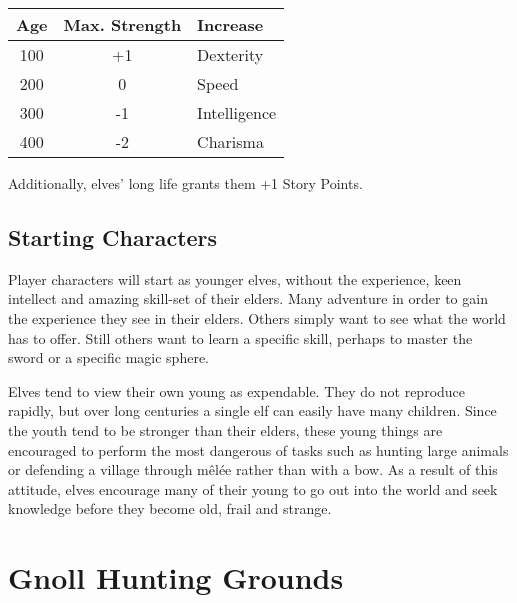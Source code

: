 \begin{multicols}{2}
	\begin{tabular}{ccl}

		Age & Max. Strength & Increase \\\hline

		100 & +1 & Dexterity \\

		200 & 0 & Speed \\

		300 & -1 & Intelligence \\

		400 & -2 & Charisma \\

	\end{tabular}

Additionally, elves' long life grants them +1 Story Points.

\subsection{Starting Characters}

Player characters will start as younger elves, without the experience, keen intellect and amazing skill-set of their elders. Many adventure in order to gain the experience they see in their elders. Others simply want to see what the world has to offer. Still others want to learn a specific skill, perhaps to master the sword or a specific magic sphere.

Elves tend to view their own young as expendable.
They do not reproduce rapidly, but over long centuries a single elf can easily have many children.
Since the youth tend to be stronger than their elders, these young things are encouraged to perform the most dangerous of tasks such as hunting large animals or defending a village through m\^{e}l\'{e}e rather than with a bow.
As a result of this attitude, elves encourage many of their young to go out into the world and seek knowledge before they become old, frail and strange.

\end{multicols}

\section[Gnolls]{Gnoll Hunting Grounds}

